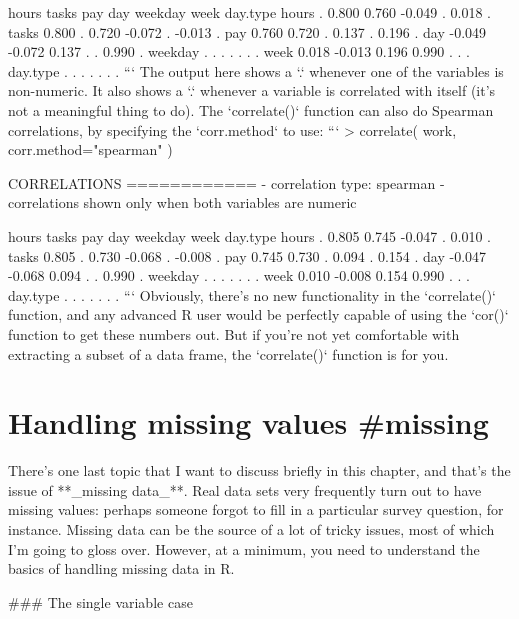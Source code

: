           hours  tasks   pay    day weekday   week day.type
hours         .  0.800 0.760 -0.049       .  0.018        .
tasks     0.800      . 0.720 -0.072       . -0.013        .
pay       0.760  0.720     .  0.137       .  0.196        .
day      -0.049 -0.072 0.137      .       .  0.990        .
weekday       .      .     .      .       .      .        .
week      0.018 -0.013 0.196  0.990       .      .        .
day.type      .      .     .      .       .      .        .
```
The output here shows a `.` whenever one of the variables is non-numeric. It also shows a `.` whenever a variable is correlated with itself (it's not a meaningful thing to do). The `correlate()` function can also do Spearman correlations, by specifying the `corr.method` to use:
```
> correlate( work, corr.method="spearman" )

CORRELATIONS
============
- correlation type:  spearman 
- correlations shown only when both variables are numeric

          hours  tasks   pay    day weekday   week day.type
hours         .  0.805 0.745 -0.047       .  0.010        .
tasks     0.805      . 0.730 -0.068       . -0.008        .
pay       0.745  0.730     .  0.094       .  0.154        .
day      -0.047 -0.068 0.094      .       .  0.990        .
weekday       .      .     .      .       .      .        .
week      0.010 -0.008 0.154  0.990       .      .        .
day.type      .      .     .      .       .      .        .
```
Obviously, there's no new functionality in the `correlate()` function, and any advanced R user would be perfectly capable of using the `cor()` function to get these numbers out. But if you're not yet comfortable with extracting a subset of a data frame, the `correlate()` function is for you.


\section{Handling missing values {#missing}}

There's one last topic that I want to discuss briefly in this chapter, and that's the issue of **_missing data_**. Real data sets very frequently turn out to have missing values: perhaps someone forgot to fill in a particular survey question, for instance. Missing data can be the source of a lot of tricky issues, most of which I'm going to gloss over. However, at a minimum, you need to understand the basics of handling missing data in R. 


### The single variable case

